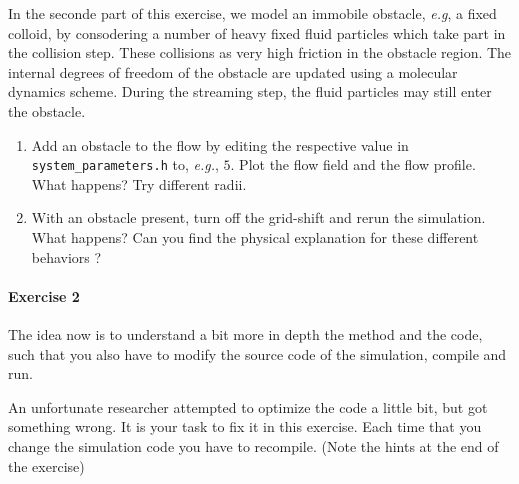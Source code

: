 \documentclass[sizes,12pt,nftimes]{article}
\begin{document}
In the seconde part of this exercise, we model an immobile obstacle,
\emph{e.g}, a fixed colloid, by consodering a number of heavy fixed
fluid particles which take part in the collision step. These
collisions as very high friction in the obstacle region. The internal
degrees of freedom of the obstacle are updated using a molecular
dynamics scheme. During the streaming step, the fluid particles may
still enter the obstacle.

\begin{enumerate} \addtocounter{enumi}{4}
\item Add an obstacle to the flow by editing the respective value in
  \mbox{\texttt{system\_parameters.h}} to, \emph{e.g.}, $5$. Plot the
  flow field and the flow profile. What happens?  Try different radii.
\item With an obstacle present, turn off the grid-shift and rerun the
  simulation. What happens? Can you find the physical explanation
  for these different behaviors ?
\end{enumerate}


\paragraph*{Exercise 2} The idea now is to understand a bit more in depth the
method and the code, such that you also have to modify the source code
of the simulation, compile and run. 
		
An unfortunate researcher attempted to optimize the code a little bit,
but got something wrong. It is your task to fix it in this
exercise. Each time that you change the simulation code you have to
recompile. (Note the hints at the end of the exercise)
		
\end{document}

